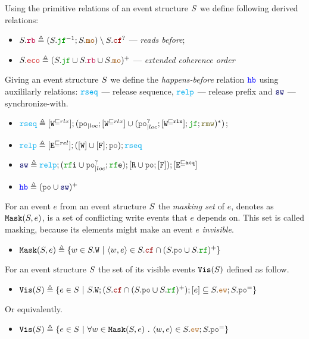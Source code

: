 \documentclass[12pt]{article}
\begin{document}
\begin{definition}
  Using the primitive relations of an event structure $S$ we define following derived relations:
  \begin{itemize}
    \item $\lES.\lRB \defeq (\lES.\lJF^{-1};\lES.\lMO) \setminus \lES.\lCF^?$ --- 
      \emph{reads before};
    \item $\lES.\lECO \defeq (\lES.\lJF \cup \lES.\lRB \cup \lES.\lMO)^+$ --- 
      \emph{extended coherence order}
  \end{itemize}
\end{definition}

\begin{definition}
  Giving an event structure $S$ we define the \emph{happens-before} relation $\lHB$
  using auxililarly relations: 
  $\lRSEQ$ --- release sequence,
  $\lRELP$ --- release prefix and
  $\lSW$ --- synchronize-with.
  \begin{itemize}
  \item $\lRSEQ \defeq [\lWsqeq{rlx}];(\lmakeLoc{\lPO};[\lWsqeq{rlx}] \cup 
    (\lmakeLoc{\lPO^?};[\lWsqeq{\rlx}];\lJF;\lRMW)^*)$;
  \item $\lRELP \defeq [\lEsqeq{rel}];([\lW] \cup [\lF];\lPO);\lRSEQ$
  \item $\lSW \defeq \lRELP; (\lRFI \cup \lmakeLoc{\lPO^?};\lRFE); [\lR \cup \lPO;[\lF]);[\lEsqeq{\acq}]$
  \item $\lHB \defeq (\lPO \cup \lSW)^+$
  \end{itemize}
\end{definition}

\begin{definition}
  For an event $e$ from an event structure $S$
  the \emph{masking set} of $e$, denotes as ${\mathtt{Mask}}(S, e)$,
  is a set of conflicting write events that $e$ depends on.
  This set is called masking, because its elements might make an event $e$ \emph{invisible}.
  \begin{itemize}
  \item $\lMASK(\lES, e) \defeq
    \{w \in \lES.\lW ~|~ \tup{w, e} \in \lES.\lCF \cap (\lES.\lPO \cup \lES.\lRF)^+ \}$
  \end{itemize}
\end{definition}

\begin{definition}
  For an event structure $S$ the set of its visible events ${\mathtt{Vis}}(S)$ defined as follow.
  \begin{itemize}
    \item $\lVIS(\lES) \defeq 
      \{ e \in \lES ~|~ \lES.\lW;(\lES.\lCF \cap (\lES.\lPO \cup \lES.\lRF)^+);[e] \subseteq 
         \lES.\lEW;\lES.\lPO^=
      \}$
  \end{itemize}
  Or equivalently.
  \begin{itemize}
    \item $\lVIS(\lES) \defeq 
      \{ e \in \lES ~|~ \forall{w \in \lMASK(\lES, e)} ~.~ \tup{w, e} \in \lES.\lEW;\lES.\lPO^=\}$
  \end{itemize}
\end{definition}
\end{document}
